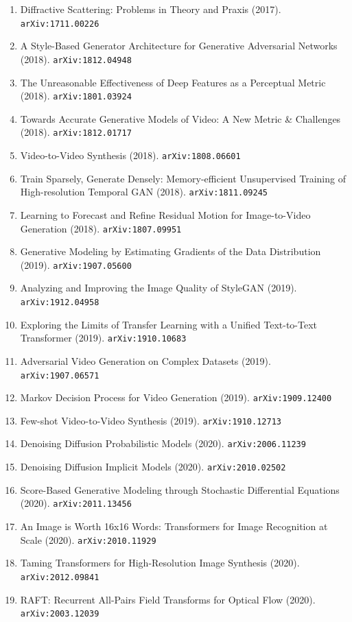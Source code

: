\documentclass[11pt]{article}
\begin{document}
\begin{enumerate}
  \item Diffractive Scattering: Problems in Theory and Praxis (2017). \texttt{arXiv:1711.00226}
  \item A Style-Based Generator Architecture for Generative Adversarial Networks (2018). \texttt{arXiv:1812.04948}
  \item The Unreasonable Effectiveness of Deep Features as a Perceptual Metric (2018). \texttt{arXiv:1801.03924}
  \item Towards Accurate Generative Models of Video: A New Metric \& Challenges (2018). \texttt{arXiv:1812.01717}
  \item Video-to-Video Synthesis (2018). \texttt{arXiv:1808.06601}
  \item Train Sparsely, Generate Densely: Memory-efficient Unsupervised Training
  of High-resolution Temporal GAN (2018). \texttt{arXiv:1811.09245}
  \item Learning to Forecast and Refine Residual Motion for Image-to-Video
  Generation (2018). \texttt{arXiv:1807.09951}
  \item Generative Modeling by Estimating Gradients of the Data Distribution (2019). \texttt{arXiv:1907.05600}
  \item Analyzing and Improving the Image Quality of StyleGAN (2019). \texttt{arXiv:1912.04958}
  \item Exploring the Limits of Transfer Learning with a Unified Text-to-Text
  Transformer (2019). \texttt{arXiv:1910.10683}
  \item Adversarial Video Generation on Complex Datasets (2019). \texttt{arXiv:1907.06571}
  \item Markov Decision Process for Video Generation (2019). \texttt{arXiv:1909.12400}
  \item Few-shot Video-to-Video Synthesis (2019). \texttt{arXiv:1910.12713}
  \item Denoising Diffusion Probabilistic Models (2020). \texttt{arXiv:2006.11239}
  \item Denoising Diffusion Implicit Models (2020). \texttt{arXiv:2010.02502}
  \item Score-Based Generative Modeling through Stochastic Differential
  Equations (2020). \texttt{arXiv:2011.13456}
  \item An Image is Worth 16x16 Words: Transformers for Image Recognition at
  Scale (2020). \texttt{arXiv:2010.11929}
  \item Taming Transformers for High-Resolution Image Synthesis (2020). \texttt{arXiv:2012.09841}
  \item RAFT: Recurrent All-Pairs Field Transforms for Optical Flow (2020). \texttt{arXiv:2003.12039}

\end{enumerate}
\end{document}
